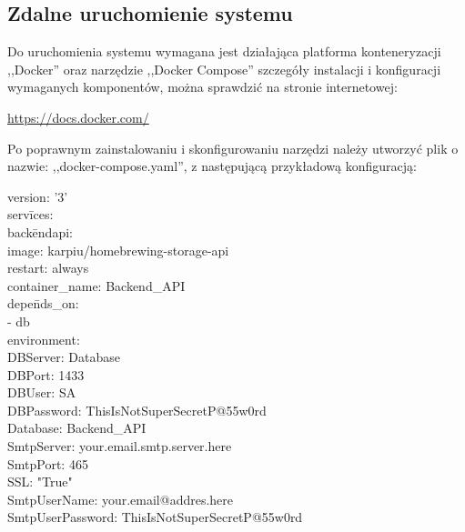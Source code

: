 \documentclass[12pt,a4paper]{article}
\begin{document}
		\subsection{Zdalne uruchomienie systemu}
			\indent Do uruchomienia systemu wymagana jest działająca platforma konteneryzacji ,,Docker''
			oraz narzędzie ,,Docker Compose'' szczegóły instalacji i konfiguracji wymaganych
			komponentów, można sprawdzić na stronie internetowej:
			\begin{tcolorbox}[minipage,colback=white,arc=0pt,outer arc=0pt, fontupper=\scriptsize]
				\center					
				\url{https://docs.docker.com/}
			\end{tcolorbox}			
			Po poprawnym zainstalowaniu i skonfigurowaniu narzędzi należy utworzyć plik o nazwie: ,,docker-compose.yaml'',
			z następującą przykładową konfiguracją:  
			\begin{tcolorbox}[minipage,colback=white,arc=0pt,outer arc=0pt, fontupper=\footnotesize]
				\begin{tabbing}
						version: '3' \\
						serv\= ices: \\
						\> back\= endapi: \\
        				\>\> image: karpiu/homebrewing-storage-api \\
        				\>\> restart: always \\
        				\>\> container\_name: Backend\_API \\
        				\>\> depe\= nds\_on: \\
            			\>\>\> - db \\ 
        				\>\> environment: \\ 
            			\>\>\> DBServer: Database \\ 
            			\>\>\> DBPort: 1433 \\ 
            			\>\>\> DBUser: SA \\
            			\>\>\> DBPassword: ThisIsNotSuperSecretP@55w0rd \\
            			\>\>\> Database: Backend\_API \\
            			\>\>\> SmtpServer: your.email.smtp.server.here \\
            			\>\>\> SmtpPort: 465 \\
						\>\>\> SSL: "True" \\
            			\>\>\> SmtpUserName: your.email@addres.here \\
            			\>\>\> SmtpUserPassword: ThisIsNotSuperSecretP@55w0rd \\

\end{tabbing}
\end{tcolorbox}
\end{document}
